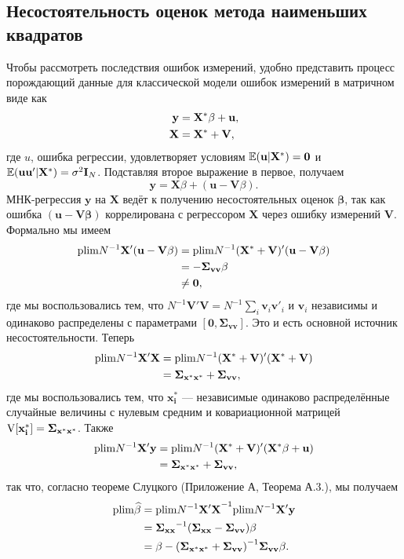 \subsection{Несостоятельность оценок метода наименьших квадратов}  

Чтобы рассмотреть последствия ошибок измерений, удобно представить процесс порождающий данные для классической модели ошибок измерений в матричном виде как 
\begin{align}
\mathbf{y}&=\mathbf{X^*}\beta+\mathbf{u}, \\
\mathbf{X}&=\mathbf{X^*}+\mathbf{V}, \notag
\end{align}
где $u$, ошибка регрессии, удовлетворяет условиям $\mathbb{E}(\mathbf{u}|\mathbf{X^*})=\mathbf{0}$ и $\mathbb{E}(\mathbf{uu'}|\mathbf{X^*})=\sigma^2\mathbf{I}_N$. Подставляя второе выражение в первое, получаем
\begin{equation}
\mathbf{y}=\mathbf{X}\beta+(\mathbf{u}-\mathbf{V}\beta).
\end{equation}
МНК-регрессия $\mathbf{y}$ на $\mathbf{X}$ ведёт к получению несостоятельных оценок $\mathbf{\beta}$, так как ошибка $(\mathbf{u}-\mathbf{V\beta})$ коррелирована с регрессором $\mathbf{X}$ через ошибку измерений $\mathbf{V}$.
Формально мы имеем
\begin{align*}
\mathrm{plim } N^{-1}\mathbf{X'}(\mathbf{u}-\mathbf{V\beta})&=\mathrm{plim } N^{-1}(\mathbf{X^*}+\mathbf{V})'(\mathbf{u}-\mathbf{V\beta}) \\
&=-\mathbf{\Sigma_{vv}}\mathbf{\beta} \\
&\neq\mathbf{0},
\end{align*}
где мы воспользовались тем, что $N^{-1}\mathbf{V'V}=N^{-1}\sum\limits_i\mathbf{v}_i\mathbf{v}'_i$ и $\mathbf{v}_i$ независимы и одинаково распределены с параметрами $[\mathbf{0}, \mathbf{\Sigma_{vv}}]$. Это и есть основной источник несостоятельности. Теперь 
\begin{align*}
\mathrm{plim } N^{-1}\mathbf{X'X}&=\mathrm{plim } N^{-1}(\mathbf{X^*+V})'(\mathbf{X^*+V}) \\
&=\mathbf{\Sigma_{x^*x^*}}+\mathbf{\Sigma_{vv}},
\end{align*}
где мы воспользовались тем, что $\mathbf{x_i^*}$ --- независимые одинаково распределённые случайные величины с нулевым средним и ковариационной матрицей $\mathrm{V}\mathbf{[x^*_i]}=\mathbf{\Sigma_{x^*x^*}}$. Также
\begin{align*}
\mathrm{plim } N^{-1}\mathbf{X'y}&=\mathrm{plim } N^{-1}(\mathbf{X^*+V})'(\mathbf{X^*\beta+u}) \\
&=\mathbf{\Sigma_{x^*x^*}}+\mathbf{\Sigma_{vv}},
\end{align*}
так что, согласно теореме Слуцкого (Приложение А, Теорема А.3.), мы получаем
\begin{align}
\mathrm{plim } \mathbf{\widehat {\beta}}&={\mathrm{plim } N^{-1}\mathbf{X'X}}^{-1}\mathrm{plim } N^{-1}\mathbf{X'y} \\
&={\mathbf{\Sigma_{xx}}}^{-1}(\mathbf{\Sigma_{xx}}-\mathbf{\Sigma_{vv}})\mathbf{\beta} \notag \\
&=\mathbf{\beta}-{(\mathbf{\Sigma_{x^*x^*}}+\mathbf{\Sigma_{vv}})}^{-1}\mathbf{\Sigma_{vv}}\mathbf{\beta}. \notag 
\end{align}

